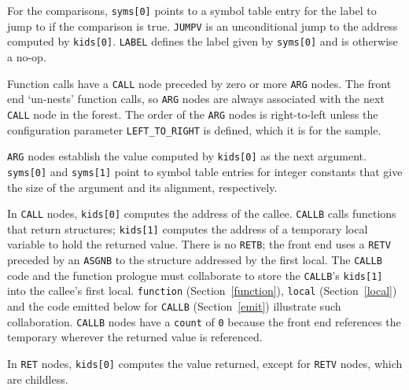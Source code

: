 For the comparisons, \verb|syms[0]| points to a symbol table entry for
the label to jump to if the comparison is true.  \verb|JUMPV| is an
unconditional jump to the address computed by \verb|kids[0]|. \verb|LABEL|
defines the label given by \verb|syms[0]| and is otherwise a no-op.

Function calls have a \verb|CALL| node preceded by zero or more
\verb|ARG| nodes. The front end `un-nests'
function calls, so \verb|ARG| nodes are always associated with the next
\verb|CALL| node in the forest. The order of the \verb|ARG| nodes is
right-to-left unless the configuration parameter \verb|LEFT_TO_RIGHT|
is defined, which it is for the sample.

\verb|ARG| nodes establish the value computed by \verb|kids[0]| as the
next argument.  \verb|syms[0]| and \verb|syms[1]| point to symbol table
entries for integer constants that give the size of the argument and
its alignment, respectively.

\label{dags:calls}

In \verb|CALL| nodes, \verb|kids[0]| computes the address of the callee.
\verb|CALLB| calls functions that return structures;
\verb|kids[1]| computes the address of a
temporary local variable to hold the returned value. There is no
\verb|RETB|; the front end uses a \verb|RETV| preceded by an
\verb|ASGNB| to the structure addressed by the first local. The
\verb|CALLB| code and the function prologue must collaborate to store the
\verb|CALLB|'s \verb|kids[1]| into the callee's first local.
\verb|function| (Section~\ref{function}), \verb|local| (Section~\ref{local})
and the code emitted below for \verb|CALLB| (Section~\ref{emit})
illustrate such collaboration.
\verb|CALLB| nodes have a \verb|count| of \verb|0| because the front end references
the temporary wherever the returned value is referenced.

In \verb|RET| nodes, \verb|kids[0]| computes the value returned, except
for \verb|RETV| nodes, which are childless.


